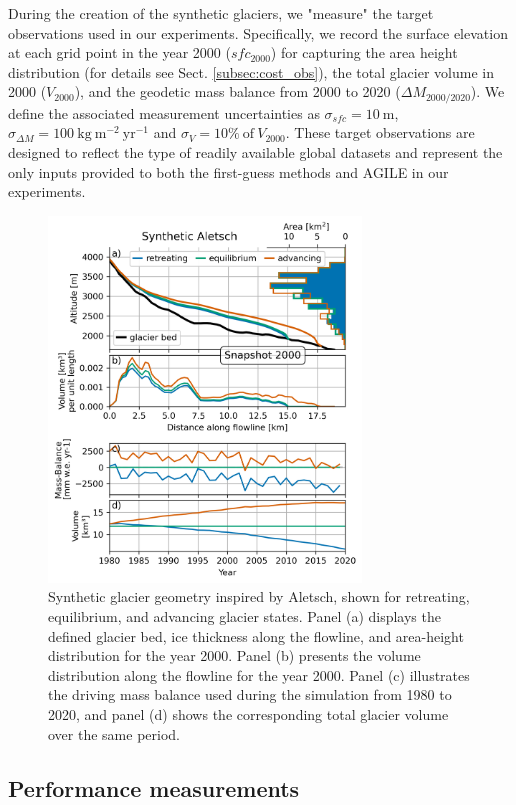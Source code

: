 \documentclass[journal abbreviation, manuscript]{copernicus}
\begin{document}
During the creation of the synthetic glaciers, we "measure" the target observations used in our experiments. Specifically, we record the surface elevation at each grid point in the year 2000 ($sfc_{2000}$) for capturing the area height distribution (for details see Sect. \ref{subsec:cost_obs}), the total glacier volume in 2000 ($V_{2000}$), and the geodetic mass balance from 2000 to 2020 ($\Delta M_{2000/2020}$). We define the associated measurement uncertainties as $\sigma_{sfc}=10~\mathrm{m}$, $\sigma_{\Delta M}=100~\mathrm{kg~m^{-2}~yr^{-1}}$  and $\sigma_{V}=10\%~ \mathrm{of}~V_{2000}$. These target observations are designed to reflect the type of readily available global datasets and represent the only inputs provided to both the first-guess methods and AGILE in our experiments.

\begin{figure}
    \centering
    \includegraphics[width=8.3cm]{fig02.png}
    \caption{Synthetic glacier geometry inspired by Aletsch, shown for retreating, equilibrium, and advancing glacier states. Panel (a) displays the defined glacier bed, ice thickness along the flowline, and area-height distribution for the year 2000. Panel (b) presents the volume distribution along the flowline for the year 2000. Panel (c) illustrates the driving mass balance used during the simulation from 1980 to 2020, and panel (d) shows the corresponding total glacier volume over the same period.}
    \label{fig:aletsch_geometry_creation}
\end{figure}



\subsection{Performance measurements}
\label{sec:performance_measurements}
\end{document}
